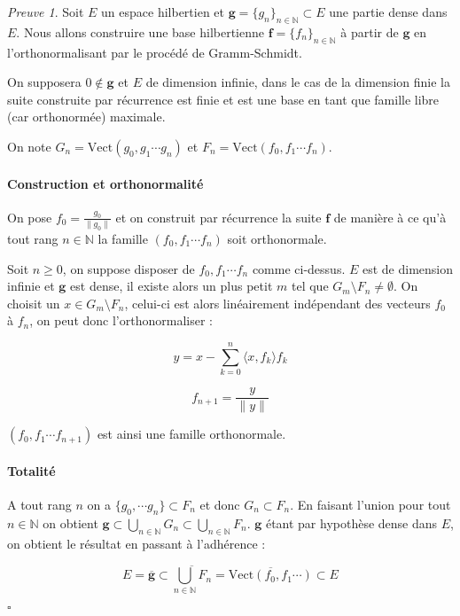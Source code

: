\documentclass[]{article}
\theoremstyle{remark}
\newtheorem{myproof}{Preuve}
\theoremstyle{definition}
\newcommand{\cqfd}{
	\hfill$\square$
}
\newcommand{\vect}{\text{Vect}}
\newcommand{\DS}{\displaystyle}
\begin{document}
	\begin{myproof}
		Soit $E$ un espace hilbertien et $\mathbf{g} = \{g_n\}_{n \in \mathbb{N}} \subset E$ une partie dense dans $E$. Nous allons construire une base hilbertienne $\mathbf{f} = \{f_n\}_{n \in \mathbb{N}}$ à partir de $\mathbf{g}$ en l'orthonormalisant par le procédé de Gramm-Schmidt.
		
		On supposera $0 \notin \mathbf{g}$ et $E$ de dimension infinie, dans le cas de la dimension finie la suite construite par récurrence est finie et est une base en tant que famille libre (car orthonormée) maximale.
		
		
		On note $G_n = \vect (g_0, g_1 \cdots g_n)$ et $F_n = \vect (f_0, f_1 \cdots f_n)$.
		
		\paragraph{Construction et orthonormalité}
		
		On pose $\DS f_0 = \frac{g_0}{\|g_0\|}$ et on construit par récurrence la suite $\mathbf{f}$ de manière à ce qu'à tout rang $n \in \mathbb{N}$ la famille $(f_0, f_1 \cdots f_n)$ soit orthonormale.
		
		Soit $n \geqslant 0$, on suppose disposer de $f_0, f_1 \cdots f_n$ comme ci-dessus. $E$ est de dimension infinie et $\mathbf{g}$ est dense, il existe alors un plus petit $m$ tel que $G_m \setminus F_n \neq \emptyset$. On choisit un $x \in G_m \setminus F_n$, celui-ci est alors linéairement indépendant des vecteurs $f_0$ à $f_n$, on peut donc  l'orthonormaliser :
		
		$$y = x - \sum_{k = 0}^{n} \langle x, f_k \rangle f_k$$
		
		$$f_{n+1} = \frac{y}{\|y\|}$$
		
		$(f_0, f_1 \cdots f_{n+1})$ est ainsi une famille orthonormale.
		
		\paragraph{Totalité}
		
		A tout rang $n$ on a $\{g_0, \cdots g_n\} \subset F_n$ et donc $G_n \subset F_n$. En faisant l'union pour tout $n \in \mathbb{N}$ on obtient $\DS \mathbf{g} \subset \bigcup_{n \in \mathbb{N}} G_n \subset \bigcup_{n \in \mathbb{N}} F_n$. $\mathbf{g}$ étant par hypothèse dense dans $E$, on obtient le résultat en passant à l'adhérence :
		
		$$E = \overline{\mathbf{g}} \subset \overline{\bigcup_{n \in \mathbb{N}} F_n} = \overline{\vect (f_0, f_1 \cdots)} \subset E$$
		\cqfd
	\end{myproof}
	
\end{document}
